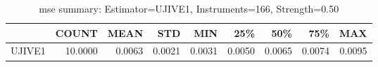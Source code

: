 \begin{table}[ht]
\centering
\caption{mse summary: Estimator=UJIVE1, Instruments=166, Strength=0.50}
\begin{tabular}{lrrrrrrrr}
\toprule
 & COUNT & MEAN & STD & MIN & 25\% & 50\% & 75\% & MAX \\
\midrule
UJIVE1 & 10.0000 & 0.0063 & 0.0021 & 0.0031 & 0.0050 & 0.0065 & 0.0074 & 0.0095 \\
\bottomrule
\end{tabular}
\end{table}
